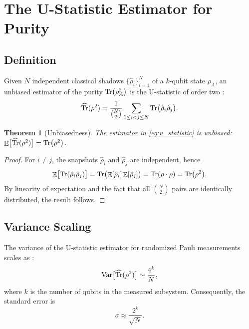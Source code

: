 \documentclass[12pt,a4paper,oneside]{book}
\theoremstyle{plain}
\newtheorem{theorem}{Theorem}[chapter]
\theoremstyle{definition}
\theoremstyle{remark}
\DeclareMathOperator{\Var}{Var}
\DeclareMathOperator{\E}{\mathbb{E}}
\begin{document}
\section{The U-Statistic Estimator for Purity}
\label{sec:u_statistic}

\subsection{Definition}

Given $N$ independent classical shadows $\{\hat{\rho}_i\}_{i=1}^{N}$ of a $k$-qubit state $\rho_A$, an unbiased estimator of the purity $\Tr(\rho_A^2)$ is the U-statistic of order two \cite{huang2020predicting, elben2020cross}:
\begin{equation}
    \label{eq:u_statistic}
    \widehat{\Tr}(\rho^2) = \frac{1}{\binom{N}{2}} \sum_{1 \leq i < j \leq N} \Tr\bigl(\hat{\rho}_i \hat{\rho}_j\bigr).
\end{equation}

\begin{theorem}[Unbiasedness]\label{thm:unbiasedness}
The estimator in \cref{eq:u_statistic} is unbiased: $\E\bigl[\widehat{\Tr}(\rho^2)\bigr] = \Tr(\rho^2)$.
\end{theorem}

\begin{proof}
For $i \neq j$, the snapshots $\hat{\rho}_i$ and $\hat{\rho}_j$ are independent, hence
\begin{equation}
    \E\bigl[\Tr(\hat{\rho}_i \hat{\rho}_j)\bigr] = \Tr\bigl(\E[\hat{\rho}_i] \E[\hat{\rho}_j]\bigr) = \Tr(\rho \cdot \rho) = \Tr(\rho^2).
\end{equation}
By linearity of expectation and the fact that all $\binom{N}{2}$ pairs are identically distributed, the result follows.
\end{proof}

\subsection{Variance Scaling}

The variance of the U-statistic estimator for randomized Pauli measurements scales as \cite{huang2020predicting, elben2020cross}:
\begin{equation}
    \label{eq:variance_scaling}
    \Var\bigl[\widehat{\Tr}(\rho^2)\bigr] \sim \frac{4^k}{N},
\end{equation}
where $k$ is the number of qubits in the measured subsystem. Consequently, the standard error is
\begin{equation}
    \label{eq:std_error}
    \sigma \approx \frac{2^k}{\sqrt{N}}.
\end{equation}
\end{document}

